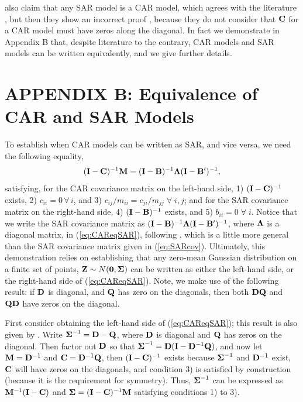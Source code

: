 \documentclass[11pt, titlepage]{article}\usepackage[]{graphicx}\usepackage[]{color}
\renewcommand{\theequation}{eqn \arabic{equation}}
\begin{document}
\citet{Dorm:etal:meth:2007} also claim that any SAR model is a CAR model, which agrees with the literature \citep[e.g.,][p. 409]{Cres:stat:1993}, but then they show an incorrect proof \citep[it is also incorrect in][p. 89,  and likely beginning there]{Hain:spat:1990}, because they do not consider that $\mathbf{C}$ for a CAR model must have zeros along the diagonal.  In fact we demonstrate in Appendix B that, despite literature to the contrary, CAR models and SAR models can be written equivalently, and we give further details.

\clearpage
\setcounter{equation}{0}
\renewcommand{\theequation}{B.\arabic{equation}}
\setcounter{figure}{0}
\renewcommand{\thefigure}{B.\arabic{figure}}
\section{APPENDIX B: Equivalence of CAR and SAR Models}

To establish when CAR models can be written as SAR, and vice versa, we need the following equality,
\begin{equation} \label{eq:CAReqSAR}
(\mathbf{I}-\mathbf{C})^{-1}\mathbf{M} = (\mathbf{I} - \mathbf{B})^{-1}\mbox{\boldmath $\Lambda$}(\mathbf{I} - \mathbf{B}^{\prime})^{-1},
\end{equation}
satisfying, for the CAR covariance matrix on the left-hand side, 1) $(\mathbf{I}-\mathbf{C})^{-1}$ exists, 2) $c_{ii} = 0 \, \forall \, i$, and 3) $c_{ij}/m_{ii}=c_{ji}/m_{jj} \; \forall \; i,j$; and for the SAR covariance matrix on the right-hand side, 4) $(\mathbf{I}-\mathbf{B})^{-1}$ exists, and 5) $b_{ii} = 0 \; \forall \; i$.  Notice that we write the SAR covariance matrix as $(\mathbf{I} - \mathbf{B})^{-1}\mbox{\boldmath $\Lambda$}(\mathbf{I} - \mathbf{B}^{\prime})^{-1}$, where $\mbox{\boldmath $\Lambda$}$ is a diagonal matrix, in (\ref{eq:CAReqSAR}), following \citet[p. 409]{Cres:stat:1993}, which is a little more general than the SAR covariance matrix given in (\ref{eq:SARcov}).  Ultimately, this demonstration relies on establishing that any zero-mean Gaussian distribution on a finite set of points, $\mathbf{Z} \sim N(\mathbf{0},\mbox{\boldmath $\Sigma$})$ can be written as either the left-hand side, or the right-hand side of (\ref{eq:CAReqSAR}).  Note, we make use of the following result: if $\mathbf{D}$ is diagonal, and $\mathbf{Q}$ has zero on the diagonals, then both $\mathbf{D}\mathbf{Q}$ and $\mathbf{Q}\mathbf{D}$ have zeros on the diagonal.  

First consider obtaining the left-hand side of (\ref{eq:CAReqSAR}); this result is also given by \citet[p. 434]{Cres:stat:1993}. Write $\mbox{\boldmath $\Sigma$}^{-1} = \mathbf{D} - \mathbf{Q}$, where $\mathbf{D}$ is diagonal and $\mathbf{Q}$ has zeros on the diagonal.  Then factor out $\mathbf{D}$ so that $\mbox{\boldmath $\Sigma$}^{-1} = \mathbf{D}(\mathbf{I} - \mathbf{D}^{-1}\mathbf{Q})$, and now let $\mathbf{M} = \mathbf{D}^{-1}$ and $\mathbf{C} = \mathbf{D}^{-1}\mathbf{Q}$, then $(\mathbf{I} - \mathbf{C})^{-1}$ exists because $\mbox{\boldmath $\Sigma$}^{-1}$ and $\mathbf{D}^{-1}$ exist, $\mathbf{C}$ will have zeros on the diagonals, and condition 3) is satisfied by construction (because it is the requirement for symmetry).  Thus, $\mbox{\boldmath $\Sigma$}^{-1}$ can be expressed as $\mathbf{M}^{-1}(\mathbf{I} - \mathbf{C})$ and $\mbox{\boldmath $\Sigma$} = (\mathbf{I}-\mathbf{C})^{-1}\mathbf{M}$ satisfying conditions 1) to 3).
\end{document}
